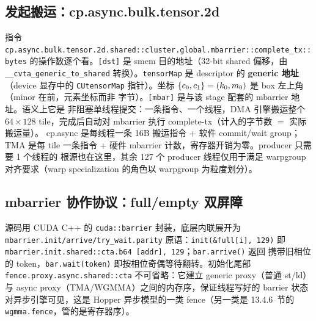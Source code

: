 \subsection{发起搬运：cp.async.bulk.tensor.2d}



指令 \texttt{cp.\allowbreak{}async.\allowbreak{}bulk.\allowbreak{}tensor.2d.\allowbreak{}shared::\allowbreak{}cluster.\allowbreak{}global.\allowbreak{}mbarrier::\allowbreak{}complete\_\allowbreak{}tx::\allowbreak{}bytes}
的操作数逐个看。\texttt{[dst]} 是 smem 目的地址（32-bit shared 偏移，由
\texttt{\_\allowbreak{}\_\allowbreak{}cvta\_\allowbreak{}generic\_\allowbreak{}to\_\allowbreak{}shared} 转换）。\texttt{tensorMap} 是 descriptor 的
\textbf{generic 地址}（device 显存中的 \texttt{CUtensorMap} 指针）。坐标
$\{c\sb{0}, c\sb{1}\} = (k\sb{0}, m\sb{0})$ 是 box 左上角（minor 在前，元素坐标而非
字节）。\texttt{[mbar]} 是与该 stage 配套的 mbarrier 地址。语义上它是
非阻塞单线程提交：一条指令、一个线程，DMA 引擎搬运整个 $64 \times 128$
tile，完成后自动对 mbarrier 执行 complete-tx（计入的字节数 $=$ 实际搬运量）。
cp.async 是每线程一条 16B 搬运指令 + 软件 commit/wait group；TMA 是每 tile
一条指令 + 硬件 mbarrier 计数，寄存器开销为零。producer 只需要 1 个线程的
根源也在这里，其余 127 个 producer 线程仅用于满足 warpgroup 对齐要求（warp
specialization 的角色以 warpgroup 为粒度划分）。

\subsection{mbarrier 协作协议：full/empty 双屏障}



源码用 CUDA C++ 的 \texttt{cuda::\allowbreak{}barrier} 封装，底层内联展开为
\texttt{mbarrier.\allowbreak{}init/\allowbreak{}arrive/\allowbreak{}try\_\allowbreak{}wait.\allowbreak{}parity} 原语：\texttt{init\allowbreak{}(\&full[i],\allowbreak{} 129)}
即 \texttt{mbarrier.\allowbreak{}init.\allowbreak{}shared::\allowbreak{}cta.\allowbreak{}b64 [addr],\allowbreak{} 129}；\texttt{bar.\allowbreak{}arrive\allowbreak{}()} 返回
携带旧相位的 token，\texttt{bar.\allowbreak{}wait\allowbreak{}(token)} 即按相位奇偶等待翻转。初始化尾部
\texttt{fence.\allowbreak{}proxy.\allowbreak{}async.\allowbreak{}shared::\allowbreak{}cta} 不可省略：它建立 generic proxy（普通
st/ld）与 async proxy（TMA/WGMMA）之间的内存序，保证线程写好的 barrier 状态
对异步引擎可见，这是 Hopper 异步模型的一类 fence（另一类是 13.4.6~节的
\texttt{wgmma.fence}，管的是寄存器序）。

